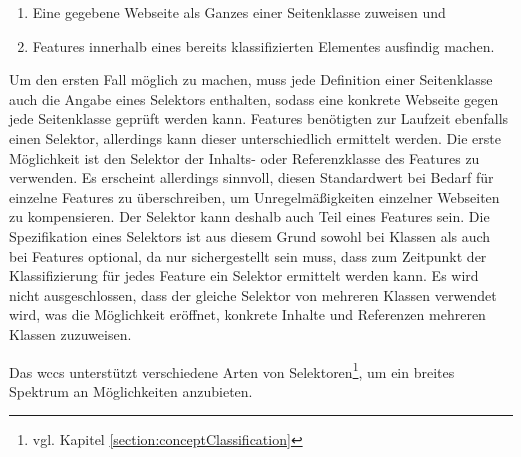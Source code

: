         \begin{enumerate}
            \item Eine gegebene Webseite als Ganzes einer Seitenklasse zuweisen und
            \item Features innerhalb eines bereits klassifizierten Elementes ausfindig machen.
        \end{enumerate}

        Um den ersten Fall möglich zu machen,
        muss jede Definition einer Seitenklasse auch die Angabe eines Selektors enthalten,
        sodass eine konkrete Webseite gegen jede Seitenklasse geprüft werden kann.
        Features benötigten zur Laufzeit ebenfalls einen Selektor,
        allerdings kann dieser unterschiedlich ermittelt werden.
        Die erste Möglichkeit ist den Selektor der Inhalts- oder
        Referenzklasse des Features zu verwenden.
        Es erscheint allerdings sinnvoll, diesen Standardwert bei Bedarf für einzelne Features
        zu überschreiben, um Unregelmäßigkeiten einzelner Webseiten zu kompensieren.
        Der Selektor kann deshalb auch Teil eines Features sein.
        Die Spezifikation eines Selektors ist aus diesem Grund sowohl
        bei Klassen als auch bei Features optional,
        da nur sichergestellt sein muss, dass zum Zeitpunkt der Klassifizierung für jedes
        Feature ein Selektor ermittelt werden kann.        
        Es wird nicht ausgeschlossen, dass der gleiche Selektor von mehreren Klassen verwendet wird,
        was die Möglichkeit eröffnet, konkrete Inhalte und Referenzen mehreren Klassen zuzuweisen.

        Das \gls{wccs} unterstützt verschiedene Arten von
        Selektoren\footnote{vgl. Kapitel \ref{section:conceptClassification}},
        um ein breites Spektrum an Möglichkeiten anzubieten.
